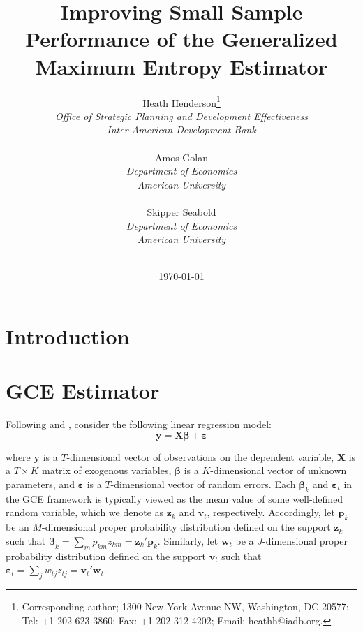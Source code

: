 \documentclass[english]{article}
\title{Improving Small Sample Performance of the Generalized Maximum 
Entropy Estimator}
\author{
Heath Henderson\thanks{Corresponding author; 1300 New York Avenue 
NW, Washington, DC 20577; Tel: +1 202 623 3860; Fax: +1 202 312 4202; 
Email: heathh@iadb.org.}\\
\textit{Office of Strategic Planning and Development Effectiveness} \\
\textit{Inter-American Development Bank} \\
\\
Amos Golan \\
\textit{Department of Economics}\\
\textit{American University} \\
\\
Skipper Seabold \\
\textit{Department of Economics}\\
\textit{American University}
\\ \\
}
\date{\today}
\begin{document}

\begin{titlepage}
\maketitle

\begin{abstract}
\end{abstract}
\thispagestyle{empty}
\end{titlepage}
\newpage


\doublespacing



\section*{Introduction}
\label{sec: intro}


\section*{GCE Estimator}
\label{sec: gme}

Following \cite{golan1996} and \citet{golan2008}, consider the following 
linear regression model: 
\begin{equation}
\mathbf{y} = \mathbf{X\beta} + \mathbf{\varepsilon}
\end{equation}

\noindent
where $\mathbf{y}$ is a $T$-dimensional vector of observations on the 
dependent variable, $\mathbf{X}$ is a $T\times K$ matrix of exogenous
variables, $\mathbf{\beta}$ is a $K$-dimensional vector of unknown 
parameters, and $\mathbf{\varepsilon}$ is a $T$-dimensional vector of 
random errors.
Each $\mathbf{\beta}_k$ and $\mathbf{\varepsilon}_t$ in the GCE 
framework is typically viewed as the mean value of some well-defined 
random variable, which we denote as $\mathbf{z}_k$ and $\mathbf{v}_t$, 
respectively.
Accordingly, let $\mathbf{p}_k$ be an $M$-dimensional proper 
probability distribution defined on the support $\mathbf{z}_k$ such that 
$\mathbf{\beta}_k = \sum_m p_{km}z_{km} = \mathbf{z}_k' 
\mathbf{p}_k$.
Similarly, let $\mathbf{w}_t$ be a $J$-dimensional proper probability 
distribution defined on the support $\mathbf{v}_t$ such that  
$\mathbf{\varepsilon}_t = \sum_j w_{tj}z_{tj} = \mathbf{v}_t' 
\mathbf{w}_t$.
\end{document}

